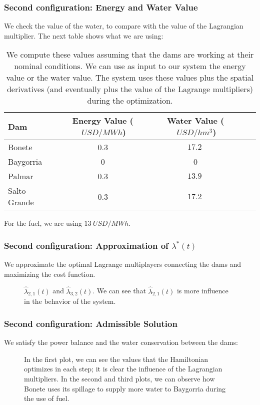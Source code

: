 \documentclass[aspectratio=169]{beamer}\usepackage[utf8]{inputenc}
\begin{document}
\begin{frame}\frametitle{Second configuration: Energy and Water Value}
We check the value of the water, to compare with the value of the Lagrangian multiplier. The next table shows what we are using:
\begin{table}[]
\begin{tabular}{lcccl}
\toprule
Dam & Energy Value ($\SI{}{USD/MWh}$) & Water Value ($\SI{}{USD/hm^3}$) \\ \midrule
Bonete & 0.3 & $\SI{17.2}{}$ \\
Baygorria & 0 & 0 \\
Palmar & 0.3 & $\SI{13.9}{}$ \\
Salto Grande & 0.3 & $\SI{17.2}{}$ \\ \bottomrule
\end{tabular}
\caption{We compute these values assuming that the dams are working at their nominal conditions. We can use as input to our system the energy value or the water value. The system uses these values plus the spatial derivatives (and eventually plus the value of the Lagrange multipliers) during the optimization.}
\end{table}
For the fuel, we are using $\SI{13}{USD/MWh}$.
\end{frame}

\begin{frame}\frametitle{Second configuration: Approximation of $\lambda^*(t)$}
We approximate the optimal Lagrange multiplayers connecting the dams and maximizing the cost function.
\begin{figure}[ht!]
\centering
{}
\caption{$\hat{\lambda}_{2,1}(t)$ and $\hat{\lambda}_{3,2}(t)$. We can see that $\hat{\lambda}_{2,1}(t)$ is more influence in the behavior of the system.}
\end{figure}
\end{frame}

\begin{frame}\frametitle{Second configuration: Admissible Solution}
We satisfy the power balance and the water conservation between the dams:
\begin{figure}[ht!]
\centering
{}
\caption{In the first plot, we can see the values that the Hamiltonian optimizes in each step; it is clear the influence of the Lagrangian multipliers. In the second and third plots, we can observe how Bonete uses its spillage to supply more water to Baygorria during the use of fuel.}
\end{figure}
\end{frame}
\end{document}
